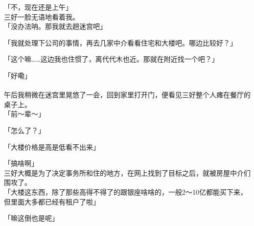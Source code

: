 「不，现在还是上午」\\

三好一脸无语地看着我。\\

「没办法呐。那我就去趟迷宫吧」

「我就处理下公司的事情，再去几家中介看看住宅和大楼吧。哪边比较好？」

「这个嘛……这边我也住惯了，离代代木也近。那就在附近找一个吧？」

「好嘞」\\

\sqsplit\\

午后我稍微在迷宫里晃悠了一会，回到家里打开门，便看见三好整个人瘫在餐厅的桌子上。\\

「前～辈～」

「怎么了？」

「大楼价格是高是低看不出来」

「搞啥啊」\\

三好大概是为了决定事务所和住的地方，在网上找到了目标之后，就被房屋中介们围攻了。\\

「大楼这东西，除了那些高得不得了的跟银座啥啥的，一般2～10亿都能买下来，但里面大多都已经有租户了啦」

「嘛这倒也是呢」\\

